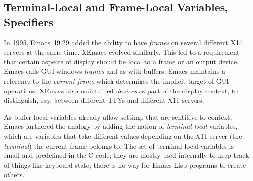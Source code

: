 \documentclass[format=acmsmall,screen]{acmart}
\newcommand \Elisp {Emacs Lisp}
\begin{document}








\subsection{Terminal-Local and Frame-Local Variables, Specifiers}

In 1995, Emacs~19.29 added the ability to have \emph{frames} on
several different X11 servers at the same time.  XEmacs evolved
similarly.  This led to a requirement that certain aspects of display
should be local to a frame or an output device.  Emacs calls GUI
windows \emph{frames} and as with buffers, Emacs maintains a reference
to the \emph{current frame} which determines the implicit target of
GUI operations.  XEmacs also maintained \emph{devices} as part of
the display context, to distinguish, say, between different TTYs and
different X11 servers.

As buffer-local variables already allow settings that are sentitive to
context, Emacs furthered the analogy by adding the notion of
\emph{terminal-local} variables, which are variables that take
different values depending on the X11 server (the \emph{terminal}) 
the current frame belongs to.  The set of terminal-local variables
is small and predefined in the C code; they are mostly used internally
to keep track of things like keyboard state; there is no way for
\Elisp{} programs to create others.
\end{document}
